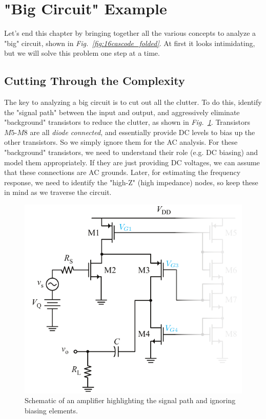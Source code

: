 \section{"Big Circuit" Example}
Let's end this chapter by bringing together all the various concepts to analyze a "big" circuit, shown in \emph{Fig.~\ref{fig:16cascode_folded}}.  At first it looks intimidating, but we will solve this problem one step at a time.
\subsection{Cutting Through the Complexity}
The key to analyzing a big circuit is to cut out all the clutter.  To do this, identify the "signal path" between the input and output, and aggressively eliminate "background" transistors to reduce the clutter, as shown in \emph{Fig.~\ref{fig:17cascode_folded_declutter}}.  Transistors $M5$-$M8$ are all \textit{diode connected}, and essentially provide DC levels to bias up the other transistors.  So we simply ignore them for the AC analysis.  For these "background" transistors, we need to understand their role (e.g. DC biasing) and model them appropriately.  If they are just providing DC voltages, we can assume that these connections are AC grounds.  Later, for estimating the frequency response, we need to identify the "high-Z" (high impedance) nodes, so keep these in mind as we traverse the circuit.
\begin{figure}[H]
\centering
\includegraphics[scale=0.85]{17cascode_folded_declutter}
\caption{Schematic of an amplifier highlighting the signal path and ignoring biasing elements.}
\label{fig:17cascode_folded_declutter}
\end{figure}

